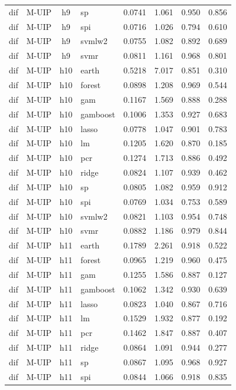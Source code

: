 \begin{ThreePartTable}
\begin{longtable}[t]{llclcccc}
dif & M-UIP & h9 & sp & 0.0741 & 1.061 & 0.950 & 0.856\\
dif & M-UIP & h9 & spi & 0.0716 & 1.026 & 0.794 & 0.610\\
dif & M-UIP & h9 & svmlw2 & 0.0755 & 1.082 & 0.892 & 0.689\\
dif & M-UIP & h9 & svmr & 0.0811 & 1.161 & 0.968 & 0.801\\
\addlinespace
dif & M-UIP & h10 & earth & 0.5218 & 7.017 & 0.851 & 0.310\\
dif & M-UIP & h10 & forest & 0.0898 & 1.208 & 0.969 & 0.544\\
dif & M-UIP & h10 & gam & 0.1167 & 1.569 & 0.888 & 0.288\\
dif & M-UIP & h10 & gamboost & 0.1006 & 1.353 & 0.927 & 0.683\\
dif & M-UIP & h10 & lasso & 0.0778 & 1.047 & 0.901 & 0.783\\
dif & M-UIP & h10 & lm & 0.1205 & 1.620 & 0.870 & 0.185\\
dif & M-UIP & h10 & pcr & 0.1274 & 1.713 & 0.886 & 0.492\\
dif & M-UIP & h10 & ridge & 0.0824 & 1.107 & 0.939 & 0.462\\
dif & M-UIP & h10 & sp & 0.0805 & 1.082 & 0.959 & 0.912\\
dif & M-UIP & h10 & spi & 0.0769 & 1.034 & 0.753 & 0.589\\
dif & M-UIP & h10 & svmlw2 & 0.0821 & 1.103 & 0.954 & 0.748\\
dif & M-UIP & h10 & svmr & 0.0882 & 1.186 & 0.979 & 0.844\\
\addlinespace
dif & M-UIP & h11 & earth & 0.1789 & 2.261 & 0.918 & 0.522\\
dif & M-UIP & h11 & forest & 0.0965 & 1.219 & 0.960 & 0.475\\
dif & M-UIP & h11 & gam & 0.1255 & 1.586 & 0.887 & 0.127\\
dif & M-UIP & h11 & gamboost & 0.1062 & 1.342 & 0.930 & 0.639\\
dif & M-UIP & h11 & lasso & 0.0823 & 1.040 & 0.867 & 0.716\\
dif & M-UIP & h11 & lm & 0.1529 & 1.932 & 0.877 & 0.192\\
dif & M-UIP & h11 & pcr & 0.1462 & 1.847 & 0.887 & 0.407\\
dif & M-UIP & h11 & ridge & 0.0864 & 1.091 & 0.944 & 0.277\\
dif & M-UIP & h11 & sp & 0.0867 & 1.095 & 0.968 & 0.927\\
dif & M-UIP & h11 & spi & 0.0844 & 1.066 & 0.918 & 0.835\\

\end{longtable}
\end{ThreePartTable}
